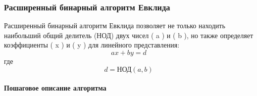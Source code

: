 \documentclass[
]{article}
\begin{document}
\subsubsection{Расширенный бинарный алгоритм
Евклида}\label{ux440ux430ux441ux448ux438ux440ux435ux43dux43dux44bux439-ux431ux438ux43dux430ux440ux43dux44bux439-ux430ux43bux433ux43eux440ux438ux442ux43c-ux435ux432ux43aux43bux438ux434ux430-1}

Расширенный бинарный алгоритм Евклида позволяет не только находить
наибольший общий делитель (НОД) двух чисел ( a ) и ( b ), но также
определяет коэффициенты ( x ) и ( y ) для линейного представления: \[
ax + by = d
\] где \[
d = \text{НОД}(a, b) 
\]

\paragraph{Пошаговое описание
алгоритма}\label{ux43fux43eux448ux430ux433ux43eux432ux43eux435-ux43eux43fux438ux441ux430ux43dux438ux435-ux430ux43bux433ux43eux440ux438ux442ux43cux430-2}
\end{document}
